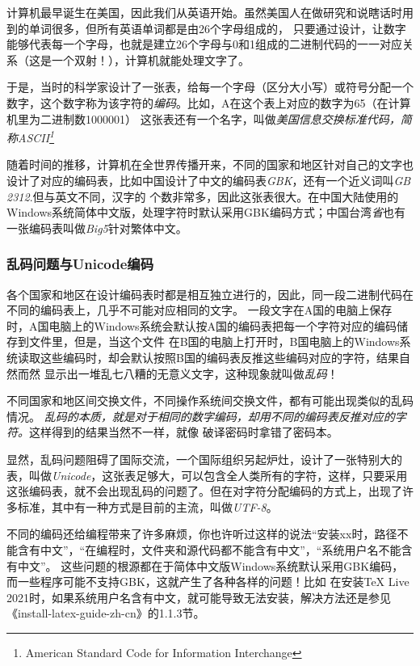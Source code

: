 计算机最早诞生在美国，因此我们从英语开始。虽然美国人在做研究和说瞎话时用到的单词很多，但所有英语单词都是由26个字母组成的，
只要通过设计，让数字能够代表每一个字母，也就是建立26个字母与0和1组成的二进制代码的一一对应关系（这是一个双射！），计算机就能处理文字了。

于是，当时的科学家设计了一张表，给每一个字母（区分大小写）或符号分配一个数字，这个数字称为该字符的\emph{编码}。比如，A在这个表上对应的数字为65（在计算机里为二进制数1000001）
这张表还有一个名字，叫做\emph{美国信息交换标准代码，简称ASCII\footnote{American Standard Code for Information Interchange}}

随着时间的推移，计算机在全世界传播开来，不同的国家和地区针对自己的文字也设计了对应的编码表，比如中国设计了中文的编码表\emph{GBK}，还有一个近义词叫\emph{GB 2312}.但与英文不同，汉字的
个数非常多，因此这张表很大。在中国大陆使用的Windows系统简体中文版，处理字符时默认采用GBK编码方式；中国台湾\emph{省}也有一张编码表叫做\emph{Big5}针对繁体中文。



\subsubsection{乱码问题与Unicode编码}
各个国家和地区在设计编码表时都是相互独立进行的，因此，同一段二进制代码在不同的编码表上，几乎不可能对应相同的文字。
一段文字在A国的电脑上保存时，A国电脑上的Windows系统会默认按A国的编码表把每一个字符对应的编码储存到文件里，但是，当这个文件
在B国的电脑上打开时，B国电脑上的Windows系统读取这些编码时，却会默认按照B国的编码表反推这些编码对应的字符，结果自然而然
显示出一堆乱七八糟的无意义文字，这种现象就叫做\emph{乱码}！

不同国家和地区间交换文件，不同操作系统间交换文件，都有可能出现类似的乱码情况。
\emph{乱码的本质，就是对于相同的数字编码，却用不同的编码表反推对应的字符。}这样得到的结果当然不一样，就像
破译密码时拿错了密码本。

显然，乱码问题阻碍了国际交流，一个国际组织另起炉灶，设计了一张特别大的表，叫做\emph{Unicode}，这张表足够大，可以包含全人类所有的字符，这样，只要采用
这张编码表，就不会出现乱码的问题了。但在对字符分配编码的方式上，出现了许多标准，其中有一种方式是目前的主流，叫做\emph{UTF-8}。

不同的编码还给编程带来了许多麻烦，你也许听过这样的说法“安装xx时，路径不能含有中文”，“在编程时，文件夹和源代码都不能含有中文”，“系统用户名不能含有中文”。
这些问题的根源都在于简体中文版Windows系统默认采用GBK编码，而一些程序可能不支持GBK，这就产生了各种各样的问题！比如
在安装\TeX{} Live 2021时，如果系统用户名含有中文，就可能导致无法安装，解决方法还是参见《install-latex-guide-zh-cn》的1.1.3节。

